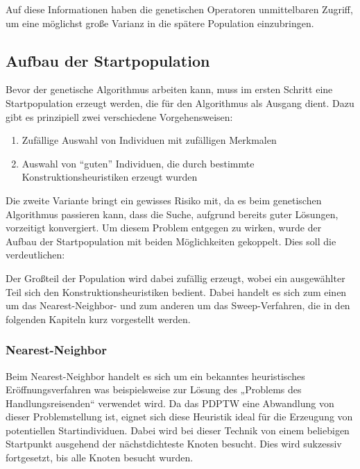 
Auf diese Informationen haben die genetischen Operatoren unmittelbaren Zugriff, um eine möglichst große Varianz in die spätere Population einzubringen.

\subsection{Aufbau der Startpopulation}
\label{sec:Startposition}
Bevor der genetische Algorithmus arbeiten kann, muss im ersten Schritt eine Startpopulation erzeugt werden, die für den Algorithmus als Ausgang dient. Dazu gibt es prinzipiell zwei verschiedene Vorgehensweisen:

\begin{enumerate}
 \item Zufällige Auswahl von Individuen mit zufälligen Merkmalen
 \item Auswahl von "`guten"' Individuen, die durch bestimmte Konstruktionsheuristiken erzeugt wurden
\end{enumerate}

Die zweite Variante bringt ein gewisses Risiko mit, da es beim genetischen Algorithmus passieren kann, dass die Suche, aufgrund bereits guter Lösungen, vorzeitigt konvergiert. Um diesem Problem entgegen zu wirken, wurde der Aufbau der Startpopulation mit beiden Möglichkeiten gekoppelt. Dies soll die   verdeutlichen:


Der Großteil der Population wird dabei zufällig erzeugt, wobei ein ausgewählter Teil sich den Konstruktionsheuristiken bedient. Dabei handelt es sich zum einen um das Nearest-Neighbor- und zum anderen um das Sweep-Verfahren, die in den folgenden Kapiteln kurz vorgestellt werden.

\subsubsection{Nearest-Neighbor}
Beim Nearest-Neighbor handelt es sich um ein bekanntes heuristisches Eröffnungsverfahren was beispielsweise zur Lösung des „Problems des Handlungsreisenden“ verwendet wird. Da das PDPTW eine Abwandlung von dieser Problemstellung ist, eignet sich diese Heuristik ideal für die Erzeugung von potentiellen Startindividuen. Dabei wird bei dieser Technik von einem beliebigen Startpunkt ausgehend der nächstdichteste Knoten besucht. Dies wird sukzessiv fortgesetzt, bis alle Knoten besucht wurden. 

